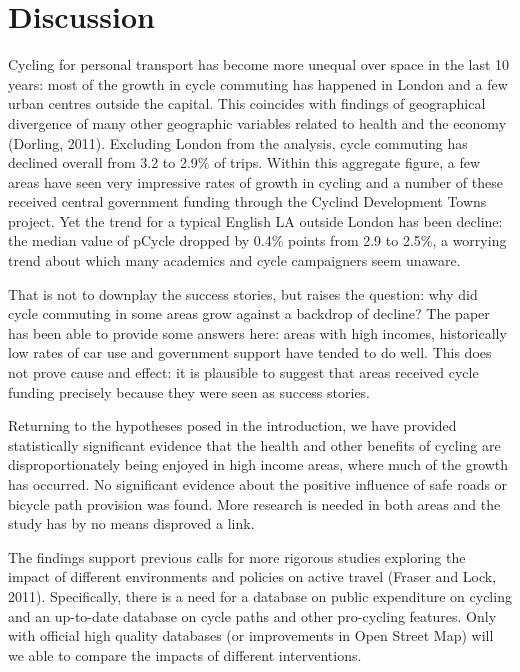 \section{Discussion}\label{discussion}

Cycling for personal transport has become more unequal over space in the
last 10 years: most of the growth in cycle commuting has happened in
London and a few urban centres outside the capital. This coincides with
findings of geographical divergence of many other geographic variables
related to health and the economy (Dorling, 2011). Excluding London from
the analysis, cycle commuting has declined overall from 3.2 to 2.9\% of
trips. Within this aggregate figure, a few areas have seen very
impressive rates of growth in cycling and a number of these received
central government funding through the Cyclind Development Towns
project. Yet the trend for a typical English LA outside London has been
decline: the median value of pCycle dropped by 0.4\% points from 2.9 to
2.5\%, a worrying trend about which many academics and cycle campaigners
seem unaware.

That is not to downplay the success stories, but raises the question:
why did cycle commuting in some areas grow against a backdrop of
decline? The paper has been able to provide some answers here: areas
with high incomes, historically low rates of car use and government
support have tended to do well. This does not prove cause and effect: it
is plausible to suggest that areas received cycle funding precisely
because they were seen as success stories.

Returning to the hypotheses posed in the introduction, we have provided
statistically significant evidence that the health and other benefits of
cycling are disproportionately being enjoyed in high income areas, where
much of the growth has occurred. No significant evidence about the
positive influence of safe roads or bicycle path provision was found.
More research is needed in both areas and the study has by no means
disproved a link.

The findings support previous calls for more rigorous studies exploring
the impact of different environments and policies on active travel
(Fraser and Lock, 2011). Specifically, there is a need for a database on
public expenditure on cycling and an up-to-date database on cycle paths
and other pro-cycling features. Only with official high quality
databases (or improvements in Open Street Map) will we able to compare
the impacts of different interventions.


